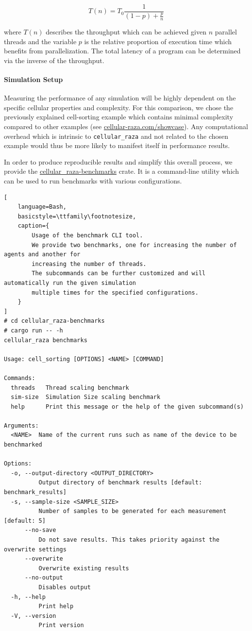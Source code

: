 \documentclass[fontsize=11pt,a4paper]{article}
\begin{document}
\begin{equation}
    T(n) = T_0\frac{1}{(1-p) + \frac{p}{n}}
    \label{eq:amdahls-law}
\end{equation}

where $T(n)$ describes the throughput which can be achieved given $n$ parallel threads and the
variable $p$ is the relative proportion of execution time which benefits from parallelization.
The total latency of a program can be determined via the inverse of the throughput.

\paragraph{Simulation Setup}
Measuring the performance of any simulation will be highly dependent on the specific cellular 
properties and complexity.
For this comparison, we chose the previously explained cell-sorting example which contains minimal
complexity compared to other examples (see
\href{https://cellular-raza.com/showcase}{cellular-raza.com/showcase}).
Any computational overhead which is intrinsic to \texttt{cellular\_raza} and not related to the
chosen example would thus be more likely to manifest itself in performance results.

In order to produce reproducible results and simplify this overall process, we provide the
\href{https://github.com/jonaspleyer/cellular_raza-benchmarks}{cellular\_raza-benchmarks} crate.
It is a command-line utility which can be used to run benchmarks with various configurations.

\begin{minipage}{\linewidth}\begin{lstlisting}[
    language=Bash,
    basicstyle=\ttfamily\footnotesize,
    caption={
        Usage of the benchmark CLI tool.
        We provide two benchmarks, one for increasing the number of agents and another for
        increasing the number of threads.
        The subcommands can be further customized and will automatically run the given simulation
        multiple times for the specified configurations.
    }
]
# cd cellular_raza-benchmarks
# cargo run -- -h
cellular_raza benchmarks

Usage: cell_sorting [OPTIONS] <NAME> [COMMAND]

Commands:
  threads   Thread scaling benchmark
  sim-size  Simulation Size scaling benchmark
  help      Print this message or the help of the given subcommand(s)

Arguments:
  <NAME>  Name of the current runs such as name of the device to be benchmarked

Options:
  -o, --output-directory <OUTPUT_DIRECTORY>
          Output directory of benchmark results [default: benchmark_results]
  -s, --sample-size <SAMPLE_SIZE>
          Number of samples to be generated for each measurement [default: 5]
      --no-save
          Do not save results. This takes priority against the overwrite settings
      --overwrite
          Overwrite existing results
      --no-output
          Disables output
  -h, --help
          Print help
  -V, --version
          Print version
\end{lstlisting}\end{minipage}
\end{document}
